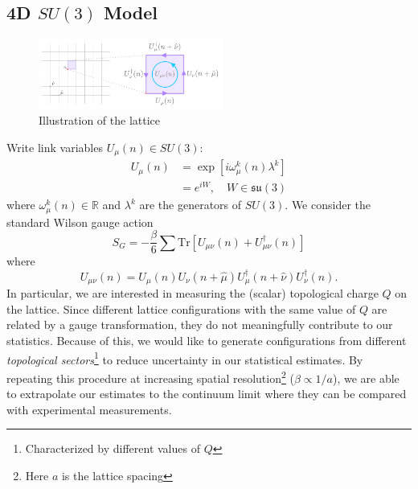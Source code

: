 \documentclass[a4paper,11pt]{article}
\begin{document}
\subsection{\label{subsec:4dSU3}4D \texorpdfstring{$SU(3)$}{SU(3)} Model}
%
\begin{figure}
  \begin{center}
    \caption{\label{fig:lattice}Illustration of the lattice}
    \includegraphics[width=0.54\textwidth]{assets/lattice-horizontal1.pdf}
  \end{center}
  \label{fig:lattice}
\end{figure}
%
Write link variables $U_{\mu}(n) \in SU(3)$:
%
\begin{align}
U_{\mu}(n) &= \exp\left[i \omega_{\mu}^{k}(n) \lambda^{k} \right] \\
&= e^{iW}, \quad W \in \mathfrak{su}(3)
\end{align}
%
where $\omega_{\mu}^{k}(n) \in \mathbb{R}$ and $\lambda^{k}$ are the generators
of $SU(3)$.
%
We consider the standard Wilson gauge action
%
\begin{equation}
S_{G} = -\frac{\beta}{6}\sum \mathrm{Tr}\left[U_{\mu\nu}(n) + U^{\dagger}_{\mu\nu}(n) \right]
\end{equation}
%
where 
\begin{equation}
    U_{\mu\nu}(n) = U_{\mu}(n) U_{\nu}(n + \hat{\mu}) U_{\mu}^{\dagger}(n + \hat{\nu}) U^{\dagger}_{\nu}(n).
\end{equation}
%
In particular, we are interested in measuring the (scalar) topological charge
$Q$ on the lattice.
%
Since different lattice configurations with the same value of $Q$ are related
by a gauge transformation, they do not meaningfully contribute to our
statistics.
%
Because of this, we would like to generate configurations from different
\textit{topological sectors}\footnote{Characterized by different values of $Q$}
to reduce uncertainty in our statistical estimates.
%
By repeating this procedure at increasing spatial resolution\footnote{Here $a$ is the lattice spacing} ($\beta \propto 1
/ a$), we are able to extrapolate our
estimates to the continuum limit where they can be compared with experimental
measurements.
\end{document}
